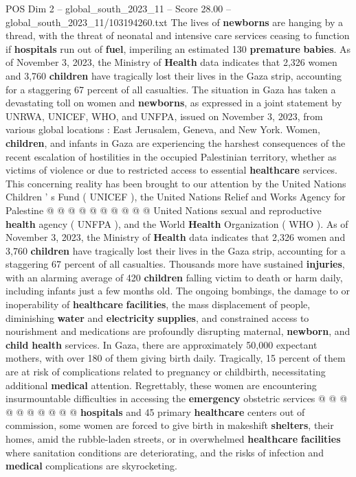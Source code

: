 \begin{textsample}{POS Dim 2 – global\_south\_2023\_11 – Score 28.00 – global\_south\_2023\_11/103194260.txt}  \label{ex:f2_pos_099}
The lives of \textbf{newborns} are hanging by a thread, with the threat of neonatal and intensive care services ceasing to function if \textbf{hospitals} run out of \textbf{fuel}, imperiling an estimated 130 \textbf{premature} \textbf{babies}.
As of November 3, 2023, the Ministry of \textbf{Health} data indicates that 2,326 women and 3,760 \textbf{children} have tragically lost their lives in the Gaza strip, accounting for a staggering 67 percent of all casualties.
The situation in Gaza has taken a devastating toll on women and \textbf{newborns}, as expressed in a joint statement by UNRWA, UNICEF, WHO, and UNFPA, issued on November 3, 2023, from various global locations : East Jerusalem, Geneva, and New York.
Women, \textbf{children}, and infants in Gaza are experiencing the harshest consequences of the recent escalation of hostilities in the occupied Palestinian territory, whether as victims of violence or due to restricted access to essential \textbf{healthcare} services.
This concerning reality has been brought to our attention by the United Nations Children ' s Fund ( UNICEF ), the United Nations Relief and Works Agency for Palestine @ @ @ @ @ @ @ @ @ @ United Nations sexual and reproductive \textbf{health} agency ( UNFPA ), and the World \textbf{Health} Organization ( WHO ).
As of November 3, 2023, the Ministry of \textbf{Health} data indicates that 2,326 women and 3,760 \textbf{children} have tragically lost their lives in the Gaza strip, accounting for a staggering 67 percent of all casualties.
Thousands more have sustained \textbf{injuries}, with an alarming average of 420 \textbf{children} falling victim to death or harm daily, including infants just a few months old.
The ongoing bombings, the damage to or inoperability of \textbf{healthcare} \textbf{facilities}, the mass displacement of people, diminishing \textbf{water} and \textbf{electricity} \textbf{supplies}, and constrained access to nourishment and medications are profoundly disrupting maternal, \textbf{newborn}, and \textbf{child} \textbf{health} services.
In Gaza, there are approximately 50,000 expectant mothers, with over 180 of them giving birth daily.
Tragically, 15 percent of them are at risk of complications related to pregnancy or childbirth, necessitating additional \textbf{medical} attention.
Regrettably, these women are encountering insurmountable difficulties in accessing the \textbf{emergency} obstetric services @ @ @ @ @ @ @ @ @ @ \textbf{hospitals} and 45 primary \textbf{healthcare} centers out of commission, some women are forced to give birth in makeshift \textbf{shelters}, their homes, amid the rubble-laden streets, or in overwhelmed \textbf{healthcare} \textbf{facilities} where sanitation conditions are deteriorating, and the risks of infection and \textbf{medical} complications are skyrocketing.

\end{textsample}
